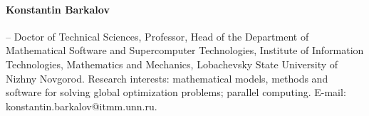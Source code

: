 \documentclass[a4paper,12pt,russian]{article}
\begin{document}
\paragraph{Konstantin Barkalov} -- Doctor of Technical Sciences, Professor, Head of the Department of Mathematical Software and Supercomputer Technologies, Institute of Information Technologies, Mathematics and Mechanics, Lobachevsky State University of Nizhny Novgorod. Research interests: mathematical models, methods and software for solving global optimization problems; parallel computing. E-mail: konstantin.barkalov@itmm.unn.ru.
\end{document}
